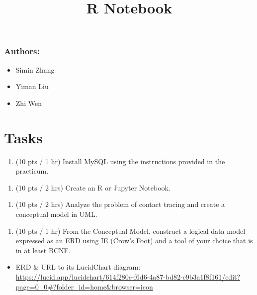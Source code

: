 \documentclass[
]{article}
\title{R Notebook}
\author{}
\date{\vspace{-2.5em}}
\providecommand{\tightlist}{%
  \setlength{\itemsep}{0pt}\setlength{\parskip}{0pt}}
\begin{document}
\maketitle

\hypertarget{authors}{%
\subsubsection{Authors:}\label{authors}}

\begin{itemize}
\tightlist
\item
  Simin Zhang
\item
  Yiman Liu
\item
  Zhi Wen
\end{itemize}

\hypertarget{tasks}{%
\section{Tasks}\label{tasks}}

\begin{enumerate}
\def\labelenumi{\arabic{enumi}.}
\tightlist
\item
  (10 pts / 1 hr) Install MySQL using the instructions provided in the
  practicum.
\end{enumerate}

\begin{enumerate}
\def\labelenumi{\arabic{enumi}.}
\setcounter{enumi}{1}
\tightlist
\item
  (10 pts / 2 hrs) Create an R or Jupyter Notebook.
\end{enumerate}

\begin{enumerate}
\def\labelenumi{\arabic{enumi}.}
\setcounter{enumi}{2}
\tightlist
\item
  (10 pts / 2 hrs) Analyze the problem of contact tracing and create a
  conceptual model in UML.
\end{enumerate}

\begin{enumerate}
\def\labelenumi{\arabic{enumi}.}
\setcounter{enumi}{3}
\tightlist
\item
  (10 pts / 1 hr) From the Conceptual Model, construct a logical data
  model expressed as an ERD using IE (Crow's Foot) and a tool of your
  choice that is in at least BCNF.
\end{enumerate}

\begin{itemize}
\tightlist
\item
  ERD \& URL to its LucidChart diagram:
  \url{https://lucid.app/lucidchart/614f280e-f6d6-4a87-bd82-e9b3a1f8f161/edit?page=0_0\#?folder_id=home\&browser=icon}
\end{itemize}
\end{document}
